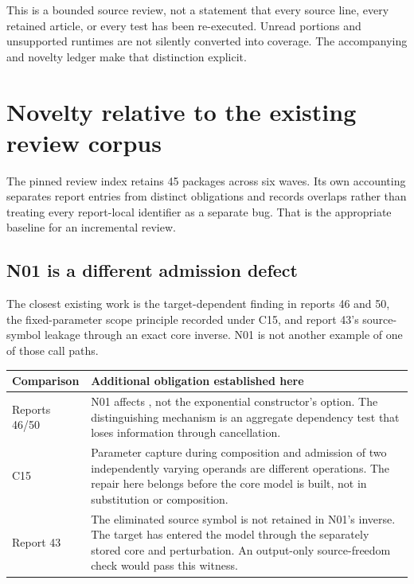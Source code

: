 \documentclass[11pt,a4paper]{article}
\theoremstyle{remark}\newtheorem{remark}[theorem]{Remark}
\newcommand{\code}[1]{\texttt{\detokenize{#1}}}
\begin{document}
This is a bounded source review, not a statement that every source line, every
retained article, or every test has been re-executed. Unread portions and
unsupported runtimes are not silently converted into coverage. The accompanying
\code{evidence/scope.json} and novelty ledger make that distinction explicit.

\section{Novelty relative to the existing review corpus}
\label{sec:novelty}

The pinned review index retains 45 packages across six waves. Its own accounting
separates report entries from distinct obligations and records overlaps rather
than treating every report-local identifier as a separate bug. That is the
appropriate baseline for an incremental review.\cite{reviewindex,status}

\subsection{N01 is a different admission defect}

The closest existing work is the target-dependent \code{SourceShift} finding
in reports 46 and 50, the fixed-parameter scope principle recorded under C15,
and report 43's source-symbol leakage through an exact core inverse. N01 is
not another example of one of those call paths.\cite{wave5,wave6,status}

\begin{longtable}{@{}p{}p{}@{}}
\toprule
Comparison & Additional obligation established here\\\midrule\endhead
Reports 46/50 & N01 affects \code{AsymptoticCoreInverse}, not the exponential
constructor's \code{SourceShift} option. The distinguishing mechanism is an
aggregate dependency test that loses information through cancellation.\\
C15 & Parameter capture during composition and admission of two independently
varying operands are different operations. The repair here belongs before the
core model is built, not in substitution or composition.\\
Report 43 & The eliminated source symbol is not retained in N01's inverse.
The target has entered the model through the separately stored core and
perturbation. An output-only source-freedom check would pass this witness.\\
\bottomrule
\end{longtable}
\end{document}
